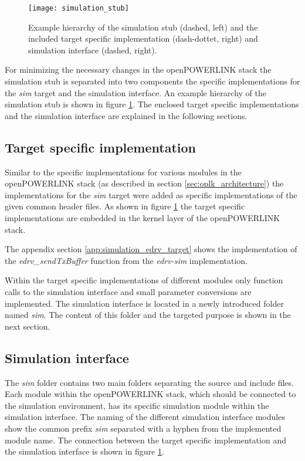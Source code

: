 \begin{figure}
    \centering
    \texttt{[image: simulation\_stub]}
    \caption{Example hierarchy of the simulation stub (dashed, left) and the included target specific implementation (dash-dottet, right) and simulation interface (dashed, right).}
    \label{fig:simulation_stub}
\end{figure}

For minimizing the necessary changes in the openPOWERLINK stack the simulation stub is separated into two components the specific implementations for the \emph{sim} target and the simulation interface.
An example hierarchy of the simulation stub is shown in figure \ref{fig:simulation_stub}.
The enclosed target specific implementations and the simulation interface are explained in the following sections.

\subsection{Target specific implementation}
\label{sec:porting_simstub_target}

Similar to the specific implementations for various modules in the openPOWERLINK stack (as described in section \ref{sec:oplk_architecture}) the implementations for the \emph{sim} target were added as specific implementations of the given common header files.
As shown in figure \ref{fig:simulation_stub} the target specific implementations are embedded in the kernel layer of the openPOWERLINK stack.

\begin{sloppypar}
The appendix section \ref{app:simulation_edrv_target} shows the implementation of the \emph{edrv\_sendTxBuffer} function from the \emph{edrv-sim} implementation.
\end{sloppypar}

Within the target specific implementations of different modules only function calls to the simulation interface and small parameter conversions are implemented.
The simulation interface is located in a newly introduced folder named \emph{sim}.
The content of this folder and the targeted purpose is shown in the next section.

\subsection{Simulation interface}
\label{sec:porting_simstub_siminterface}
The \emph{sim} folder contains two main folders separating the source and include files.
Each module within the openPOWERLINK stack, which should be connected to the simulation environment, has its specific simulation module within the simulation interface.
The naming of the different simulation interface modules show the common prefix \emph{sim} separated with a hyphen from the implemented module name.
The connection between the target specific implementation and the simulation interface is shown in figure \ref{fig:simulation_stub}. 

